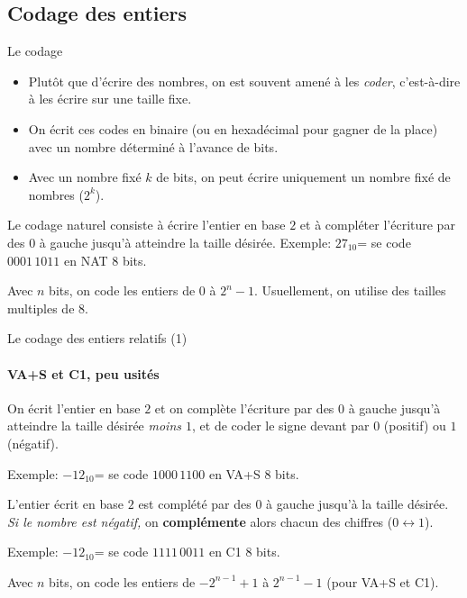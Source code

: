 \subsection{Codage des entiers}
\begin{frame}{Le codage}
  \begin{itemize}
  \item Plutôt que d'écrire des nombres, on est souvent amené à les
    \emph{coder}, c'est-à-dire à les écrire sur une taille fixe.
  \item On écrit ces codes en binaire (ou en hexadécimal pour gagner de la
    place) avec un nombre déterminé à l'avance de bits.
  \item Avec un nombre fixé $k$ de bits, on peut écrire uniquement un nombre
    fixé de nombres ($2^k$).
  \end{itemize}
  \begin{definition}
    Le codage naturel consiste à écrire l'entier en base $2$ et à
    compléter l'écriture par des $0$ à gauche jusqu'à atteindre la taille
    désirée. Exemple: $27_{10}$= se code $0001\,1011$ en NAT 8 bits.

    Avec $n$ bits, on code les entiers de $0$ à $2^n-1$. Usuellement, on
    utilise des tailles multiples de 8.
  \end{definition}
\end{frame}
\begin{frame}{Le codage des entiers relatifs (1)}
  \framesubtitle{VA+S et C1, peu usités}
  \begin{definition}
    On écrit l'entier en base $2$ et on complète l'écriture par des $0$ à
    gauche jusqu'à atteindre la taille désirée \emph{moins $1$}, et de coder le
    signe devant par $0$ (positif) ou $1$ (négatif).

    Exemple: $-12_{10}$= se code $1000\,1100$ en VA+S 8 bits.
  \end{definition}
  \begin{definition}
    L'entier écrit en base $2$ est complété par des $0$ à gauche jusqu'à la
    taille désirée. \emph{Si le nombre est négatif,} on \textbf{complémente}
    alors chacun des chiffres ($0\leftrightarrow1$).

    Exemple: $-12_{10}$= se code $1111\,0011$ en C1 8 bits.
  \end{definition}
  Avec $n$ bits, on code les entiers de $-2^{n-1}+1$ à $2^{n-1}-1$ (pour VA+S et C1).
\end{frame}
